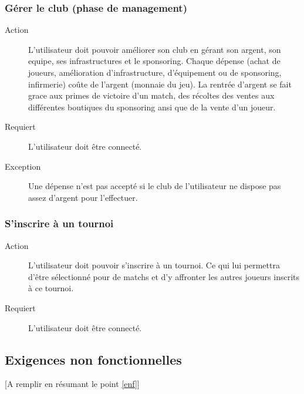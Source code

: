 \documentclass[a4paper]{article}
\begin{document}
\subsubsection{Gérer le \gls{club} (phase de management)}
\begin{description}
\item[Action] L'\gls{utilisateur} doit pouvoir améliorer son \gls{club} en gérant son argent, son \gls{equipe}, ses infrastructures et le sponsoring. Chaque dépense (achat de \glspl{joueur}, amélioration d'infrastructure, d'équipement ou de sponsoring, infirmerie) coûte de l'argent (monnaie du jeu). La rentrée d'argent se fait grace aux primes de victoire d'un match, des récoltes des ventes aux différentes boutiques du sponsoring ansi que de la vente d'un \gls{joueur}.
\item[Requiert] L'\gls{utilisateur} doit être connecté.
\item[Exception] Une dépense n'est pas accepté si le \gls{club} de l'\gls{utilisateur} ne dispose pas assez d'argent pour l'effectuer.
\end{description}

\subsubsection{S'inscrire à un tournoi}
\begin{description}
\item[Action] L'\gls{utilisateur} doit pouvoir s'inscrire à un tournoi.
Ce qui lui permettra d'être sélectionné pour de matchs et d'y affronter les autres joueurs inscrits à ce tournoi. %
\item[Requiert] L'\gls{utilisateur} doit être connecté.
\end{description} 


\subsection{Exigences non fonctionnelles}
[A remplir en résumant le point \ref{enf}]

\end{document}
